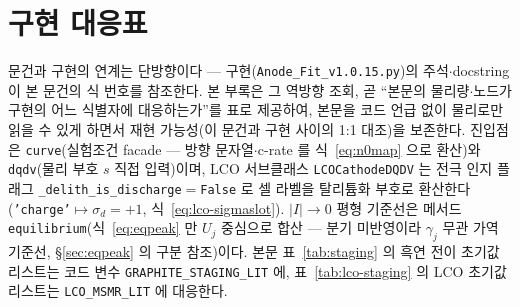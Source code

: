 \documentclass[11pt,a4paper]{article}
\newcommand{\code}[1]{\texttt{#1}}
\begin{document}
\section{구현 대응표}\label{sec:appendix-code}
문건과 구현의 연계는 단방향이다 --- 구현(\code{Anode\_Fit\_v1.0.15.py})의 주석$\cdot$docstring 이 본 문건의
식 번호를 참조한다. 본 부록은 그 역방향 조회, 곧 ``본문의 물리량$\cdot$노드가 구현의 어느 식별자에
대응하는가''를 표로 제공하여, 본문을 코드 언급 없이 물리로만 읽을 수 있게 하면서 재현 가능성(이 문건과
구현 사이의 1:1 대조)을 보존한다. 진입점은 \code{curve}(실험조건 facade — 방향 문자열$\cdot$c-rate 를
식~\eqref{eq:n0map} 으로 환산)와 \code{dqdv}(물리 부호 $s$ 직접 입력)이며, LCO 서브클래스
\code{LCOCathodeDQDV} 는 전극 인지 플래그 \code{\_delith\_is\_discharge}$=$\code{False} 로 셀 라벨을
탈리튬화 부호로 환산한다(\code{'charge'}$\mapsto\sigma_d{=}+1$, 식~\eqref{eq:lco-sigmaslot}). $|I|\to0$
평형 기준선은 메서드 \code{equilibrium}(식~\eqref{eq:eqpeak} 만 $U_j$ 중심으로 합산 — 분기
미반영이라 $\gamma_j$ 무관 가역 기준선, \S\ref{sec:eqpeak} 의 구분 참조)이다. 본문 표~\ref{tab:staging} 의
흑연 전이 초기값 리스트는 코드 변수 \code{GRAPHITE\_STAGING\_LIT} 에, 표~\ref{tab:lco-staging} 의 LCO
초기값 리스트는 \code{LCO\_MSMR\_LIT} 에 대응한다.
\end{document}
